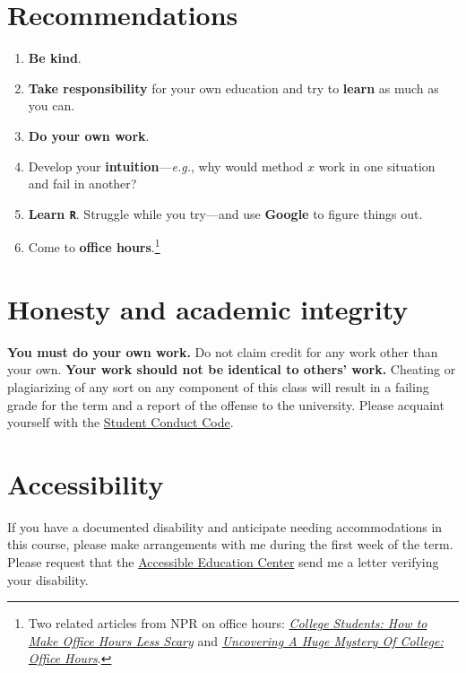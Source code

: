 \documentclass[10pt]{article}
\newcommand{\emf}[1]{\textbf{\textcolor{grass_green}{#1}}}
\begin{document}
\section*{Recommendations}

\begin{enumerate}
  \item \emf{Be kind}.
  \item \emf{Take responsibility} for your own education and try to \emf{learn} as much as you can.
  \item \emf{Do your own work}.
  \item Develop your \emf{intuition}---\textit{e.g.}, why would method $x$ work in one situation and fail in another?
  \item \emf{Learn \texttt{R}}. Struggle while you try---and use \emf{Google} to figure things out.
  \item Come to \emf{office hours}.\footnote{Two related articles from NPR on office hours: \href{https://www.npr.org/2019/10/05/678815966/college-students-how-to-make-office-hours-less-scary}{\textit{College Students: How to Make Office Hours Less Scary}} and \href{https://www.npr.org/2019/10/02/766568824/uncovering-a-huge-mystery-of-college-office-hours}{\textit{Uncovering A Huge Mystery Of College: Office Hours}}.}
\end{enumerate}

\section*{Honesty and academic integrity}

\emf{You must do your own work.} Do not claim credit for any work other than your own. \emf{Your work should not be identical to others' work.} Cheating or plagiarizing of any sort on any component of this class will result in a failing grade for the term and a report of the offense to the university. Please acquaint yourself with the \href{http://studentlife.uoregon.edu}{Student Conduct Code}.

\section*{Accessibility}

If you have a documented disability and anticipate needing accommodations in this course, please make arrangements with me during the first week of the term. Please request that the \href{https://aec.uoregon.edu/}{Accessible Education Center} send me a letter verifying your disability.
\end{document}
